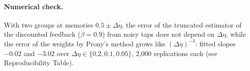 \paragraph{Numerical check.} With two groups at memories $0.5\pm\Delta\eta$, the error of the truncated estimator of the discounted feedback ($\beta=0.9$) from noisy taps does not depend on $\Delta\eta$, while the error of the weights by Prony's method grows like $(\Delta\eta)^{-3}$: fitted slopes $-0.02$ and $-3.02$ over $\Delta\eta\in\{0.2,0.1,0.05\}$, 2,000 replications each (see Reproducibility Table).
